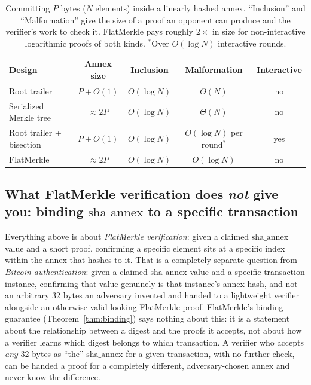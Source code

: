 \begin{table}[htbp]
\centering
\begin{tabular}{@{}lcccc@{}}
\toprule
Design & Annex size & Inclusion & Malformation & Interactive \\
\midrule
Root trailer            & $P + O(1)$ & $O(\log N)$ & $\Theta(N)$ & no \\
Serialized Merkle tree  & $\approx 2P$ & $O(\log N)$ & $\Theta(N)$ & no \\
Root trailer + bisection & $P + O(1)$ & $O(\log N)$ & $O(\log N)$ per round$^{*}$ & yes \\
FlatMerkle              & $\approx 2P$ & $O(\log N)$ & $O(\log N)$ & no \\
\bottomrule
\end{tabular}
\caption{Committing $P$ bytes ($N$ elements) inside a linearly hashed
annex. ``Inclusion'' and ``Malformation'' give the size of a proof an
opponent can produce and the verifier's work to check it. FlatMerkle
pays roughly $2\times$ in size for non-interactive logarithmic proofs of
both kinds. $^{*}$Over $O(\log N)$ interactive rounds.}
\label{tab:annex-alternatives}
\end{table}

\subsection{What FlatMerkle verification does \emph{not} give you: binding \texorpdfstring{$\mathrm{sha\_annex}$}{sha\_annex} to a specific transaction}
\label{sec:annex-authentication}

Everything above is about \emph{FlatMerkle verification}: given a claimed
$\mathrm{sha\_annex}$ value and a short proof, confirming a specific
element sits at a specific index within the annex that hashes to it. That
is a completely separate question from \emph{Bitcoin authentication}: given
a claimed $\mathrm{sha\_annex}$ value and a specific transaction instance,
confirming that value genuinely is that instance's annex hash, and not an
arbitrary 32 bytes an adversary invented and handed to a lightweight
verifier alongside an otherwise-valid-looking FlatMerkle proof.
FlatMerkle's binding guarantee (Theorem~\ref{thm:binding}) says nothing
about this: it is a statement about the relationship between a digest and
the proofs it accepts, not about how a verifier learns which digest
belongs to which transaction. A verifier who accepts \emph{any} 32 bytes as
``the'' $\mathrm{sha\_annex}$ for a given transaction, with no further
check, can be handed a proof for a completely different, adversary-chosen
annex and never know the difference.

